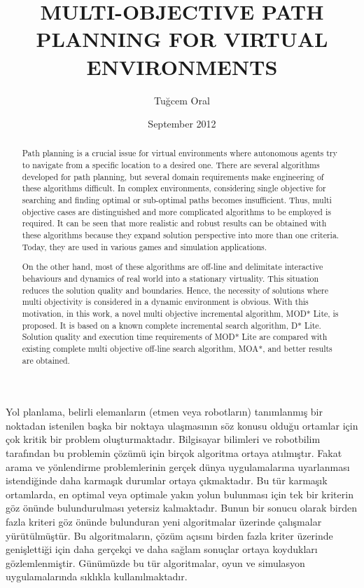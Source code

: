 \documentclass[11pt,oneandhalf,chaparabic]{metu}
\author{Tuğcem Oral}
\title{MULTI-OBJECTIVE PATH PLANNING FOR VIRTUAL ENVIRONMENTS}
\date{September 2012}
\begin{document}
\begin{preliminaries}
\maketitle
\makeapproval
\plagiarism
\setlength{\parindent}{0em}
\setlength{\parskip}{10pt}

\begin{abstract} \oneandhalfspacing
Path planning is a crucial issue for virtual environments where autonomous agents try to navigate from a specific location to a desired one. There are several algorithms developed for path planning, but several domain requirements make engineering of these algorithms difficult. In complex environments, considering single objective for searching and finding optimal or sub-optimal paths becomes insufficient. Thus, multi objective cases are distinguished and more complicated algorithms to be employed is required. It can be seen that more realistic and robust results can be obtained with these algorithms because they expand solution perspective into more than one criteria. Today, they are used in various games and simulation applications.

On the other hand, most of these algorithms are off-line  and delimitate interactive behaviours and dynamics of real world into a stationary virtuality. This situation reduces the solution quality and boundaries. Hence, the necessity of solutions where multi objectivity is considered in a dynamic environment is obvious. With this motivation, in this work, a novel multi objective incremental algorithm, MOD* Lite, is proposed. It is  based on a known complete incremental search algorithm, D* Lite. Solution quality and execution time requirements of MOD* Lite are compared with existing complete multi objective off-line search algorithm, MOA*, and better results are obtained.
\end{abstract}

\begin{oz} \oneandhalfspacing
Yol planlama, belirli elemanların (etmen veya robotların) tanımlanmış bir noktadan istenilen başka bir noktaya ulaşmasının söz konusu olduğu ortamlar için çok kritik bir problem oluşturmaktadır. Bilgisayar bilimleri ve robotbilim tarafından bu problemin çözümü için birçok algoritma ortaya atılmıştır. Fakat arama ve yönlendirme problemlerinin gerçek dünya uygulamalarına uyarlanması istendiğinde daha karmaşık durumlar ortaya çıkmaktadır. Bu tür karmaşık ortamlarda, en optimal veya optimale yakın yolun bulunması için tek bir kriterin göz önünde bulundurulması yetersiz kalmaktadır. Bunun bir sonucu olarak birden fazla kriteri göz önünde bulunduran yeni algoritmalar üzerinde çalışmalar yürütülmüştür. Bu algoritmaların, çözüm açısını birden fazla kriter üzerinde genişlettiği için daha gerçekçi ve daha sağlam sonuçlar ortaya koydukları gözlemlenmiştir. Günümüzde bu tür algoritmalar, oyun ve simulasyon uygulamalarında sıklıkla kullanılmaktadır.


\end{oz}
\end{preliminaries}
\end{document}
